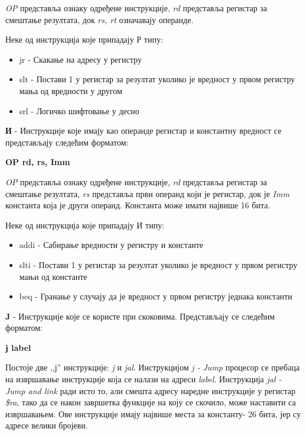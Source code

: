 \documentclass[12pt,oneside]{memoir}
\begin{document}
\textit{OP} представља ознаку одређене инструкције, \textit{rd} представља регистар за смештање резултата, док \textit{rs, rt} означавају операнде.

Неке од инструкција које припадају Р типу:

\begin{itemize}
\item jr - Скакање на адресу у регистру
\item slt - Постави 1 у регистар за резултат уколико је вредност у првом регистру мања од вредности у другом
\item srl - Логичко шифтовање у десно
\end{itemize}

\textbf{И} - Инструкције које имају као операнде регистар и константну вредност се представљају следећим форматом:
\begin{listing}
\centering
\textbf{OP rd, rs, Imm}
\end{listing}

\textit{OP} представља ознаку одређене инструкције, \textit{rd} представља регистар за смештање резултата, \textit{rs} представља први операнд који је регистар, док је \textit{Imm} константа која је други операнд. Константа може имати највише 16 бита.

Неке од инструкција које припадају И типу:

\begin{itemize}
\item addi - Сабирање вредности у регистру и константе
\item slti - Постави 1 у регистар за резултат уколико је вредност у првом регистру мањи од константе
\item beq - Гранање у случају да је вредност у првом регистру једнака константи
\end{itemize}

\textbf{J} - Инструкције које се користе при скоковима.
Представљају се следећим форматом:
\begin{listing}
\centering
\textbf{ј label}
\end{listing}

Постоје две ,,ј'' инструкције: \textit{j} и \textit{jal}. Инструкцијом \textit{j - Jump }процесор се пребаца на извршавање инструкције која се налази на адреси \textit{label}. Инструкција \textit{jal - Jump and link} ради исто то, али смешта адресу наредне инструкције у регистар \textit{\$ra}, тако да се након завршетка функције на коју се скочило, може наставити са извршавањем. Ове инструкције имају највише места за константу- 26 бита, јер су адресе велики бројеви.
\end{document}
